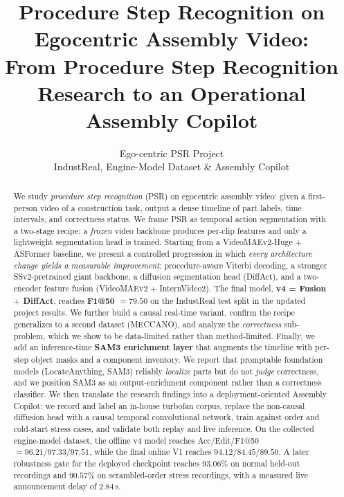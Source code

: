 \documentclass[11pt]{article}
\title{\vspace{-1.5em}\textbf{Procedure Step Recognition on Egocentric Assembly Video:\\
From Procedure Step Recognition Research to an Operational Assembly Copilot}}
\author{Ego-centric PSR Project \\ \small IndustReal, Engine-Model Dataset \& Assembly Copilot}
\date{}
\newcommand{\best}[1]{\textcolor{best}{\textbf{#1}}}
\begin{document}
\maketitle
\vspace{-2em}

\begin{abstract}
\noindent
We study \emph{procedure step recognition} (PSR) on egocentric assembly video: given a first-person
video of a construction task, output a dense timeline of part labels, time intervals, and correctness status.
We frame PSR as temporal action segmentation with a two-stage recipe:
a \emph{frozen} video backbone produces per-clip features and only a lightweight segmentation head is trained.
Starting from a VideoMAEv2\nobreakdash-Huge $+$ ASFormer baseline, we present a controlled progression in which
\emph{every architecture change yields a measurable improvement}: procedure-aware Viterbi decoding, a stronger
SSv2\nobreakdash-pretrained giant backbone, a diffusion segmentation head (DiffAct), and a two-encoder feature
fusion (VideoMAEv2 $+$ InternVideo2). The final model, \textbf{v4 = Fusion $+$ DiffAct}, reaches
\best{F1@50 $=79.50$} on the IndustReal test split in the updated project results. We further build a causal
real-time variant, confirm the recipe generalizes to a second dataset
(MECCANO), and analyze the \emph{correctness} sub-problem, which we show to be data-limited rather than
method-limited. Finally, we add an inference-time \textbf{SAM3 enrichment layer} that augments the timeline with
per-step object masks and a component inventory. We report that promptable foundation models (LocateAnything,
SAM3) reliably \emph{localize} parts but do not \emph{judge} correctness, and we position SAM3 as an output-enrichment
component rather than a correctness classifier. We then translate the research findings into a deployment-oriented
Assembly Copilot: we record and label an in-house turbofan corpus, replace the non-causal diffusion head with a
causal temporal convolutional network, train against order and cold-start stress cases, and validate both replay and
live inference. On the collected engine-model dataset, the offline v4 model reaches
Acc/Edit/F1@50 $=96.21/97.33/97.51$, while the final online V1 reaches $94.12/84.45/89.50$. A later robustness
gate for the deployed checkpoint reaches $93.06\%$ on normal held-out recordings and $90.57\%$ on scrambled-order
stress recordings, with a measured live announcement delay of $2.84$\,s.
\end{abstract}
\end{document}
